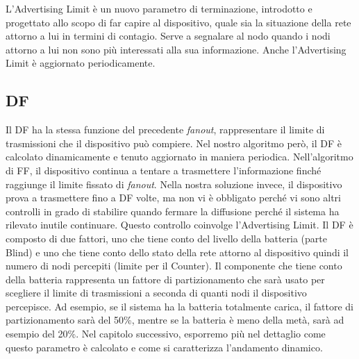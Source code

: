 L'Advertising Limit è un nuovo parametro di terminazione, introdotto e progettato allo scopo di far capire al dispositivo, quale sia la situazione della rete attorno a lui in termini di contagio. Serve a segnalare al nodo quando i nodi attorno a lui non sono più interessati alla sua informazione. Anche l'Advertising Limit è aggiornato periodicamente.

\subsection{\acf{DF}}
Il \acf{DF} ha la stessa funzione del precedente \textit{fanout}, rappresentare il limite di trasmissioni che il dispositivo può compiere. Nel nostro algoritmo però, il \acs{DF} è calcolato dinamicamente e tenuto aggiornato in maniera periodica. Nell'algoritmo di \acs{FF}, il dispositivo continua a tentare a trasmettere l'informazione finché raggiunge il limite fissato di \textit{fanout}. Nella nostra soluzione invece, il dispositivo prova a trasmettere fino a \acs{DF} volte, ma non vi è obbligato perché vi sono altri controlli in grado di stabilire quando fermare la diffusione perché il sistema ha rilevato inutile continuare. Questo controllo coinvolge l'Advertising Limit. Il DF è composto di due fattori, uno che tiene conto del livello della batteria (parte Blind) e uno che tiene conto dello stato della rete attorno al dispositivo quindi il numero di nodi percepiti (limite per il Counter). Il componente che tiene conto della batteria rappresenta un fattore di partizionamento che sarà usato per scegliere il limite di trasmissioni a seconda di quanti nodi il dispositivo percepisce. Ad esempio, se il sistema ha la batteria totalmente carica, il fattore di partizionamento sarà del 50\%, mentre se la batteria è meno della metà, sarà ad esempio del 20\%. Nel capitolo successivo, esporremo più nel dettaglio come questo parametro è calcolato e come si caratterizza l'andamento dinamico.

